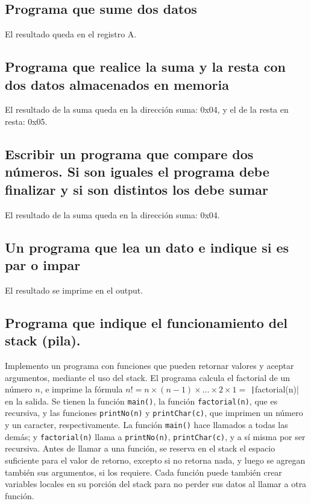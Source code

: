 \documentclass{article}
\begin{document}


\setcounter{section}{1}
\subsection{Programa que sume dos datos}
El resultado queda en el registro A.

\subsection{Programa que realice la suma y la resta con dos datos almacenados en memoria}
El resultado de la suma queda en la dirección suma: 0x04, y el de la resta en resta: 0x05.

\subsection{Escribir un programa que compare dos números. Si son iguales el programa debe finalizar y si son distintos los debe sumar}
El resultado de la suma queda en la dirección suma: 0x04.

\subsection{Un programa que lea un dato e indique si es par o impar}
El resultado se imprime en el output.

\subsection{Programa que indique el funcionamiento del stack (pila).}
Implemento un programa con funciones que pueden retornar valores y aceptar argumentos, mediante el uso del stack. El programa calcula el factorial de un número $n$, e imprime la fórmula $n! = n \times (n-1) \times \dots \times 2 \times 1 =$ \texttt|factorial(n)| en la salida. Se tienen la función \texttt{main()}, la función \texttt{factorial(n)}, que es recursiva, y las funciones \texttt{printNo(n)} y \texttt{printChar(c)}, que imprimen un número y un caracter, respectivamente. La función \texttt{main()} hace llamados a todas las demás; y \texttt{factorial(n)} llama a \texttt{printNo(n)}, \texttt{printChar(c)}, y a sí misma por ser recursiva. 
Antes de llamar a una función, se reserva en el stack el espacio suficiente para el valor de retorno, excepto si no retorna nada, y luego se agregan también sus argumentos, si los requiere. Cada función puede también crear variables locales en su porción del stack para no perder sus datos al llamar a otra función.
\end{document}
